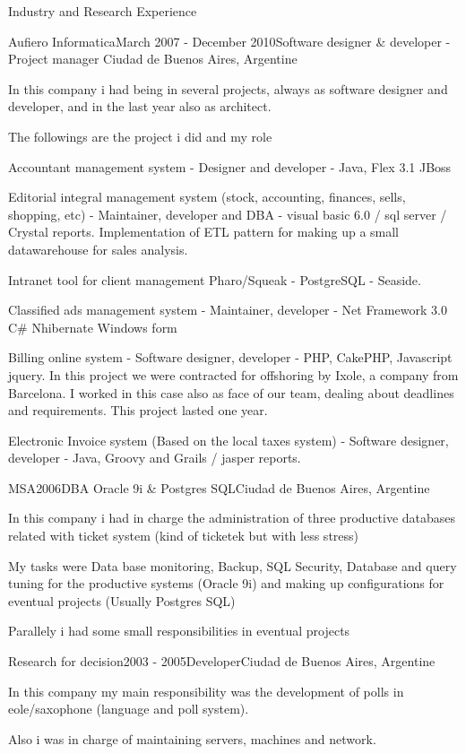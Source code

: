 \documentclass{resume} %
\begin{document}
\begin{rSection}{Industry and Research Experience}
\begin{rSubsection}{Aufiero Informatica}{March 2007 - December 2010}{Software designer \& developer - Project manager }{Ciudad de Buenos Aires, Argentine}
\item In this company i had being in several projects, always as software designer and developer, and in the last year also as architect. 
\item The followings are the project i did and my role
\item Accountant management system - Designer and developer - Java, Flex 3.1 JBoss 
\item Editorial integral management system (stock, accounting, finances, sells, shopping, etc) - Maintainer, developer and DBA - visual basic 6.0 / sql server / Crystal reports. Implementation of ETL pattern for making up a small datawarehouse for sales analysis.
\item Intranet tool for client management Pharo/Squeak - PostgreSQL - Seaside. 
\item Classified ads management system - Maintainer, developer  - Net Framework 3.0 C\# Nhibernate Windows form
\item Billing online system - Software designer, developer - PHP, CakePHP, Javascript jquery. In this project we were contracted for offshoring by Ixole, a company from Barcelona. I worked in this case also as face of our team, dealing about deadlines and requirements. This project lasted one year.
\item Electronic Invoice system (Based on the local taxes system)  -  Software designer, developer - Java, Groovy and Grails / jasper reports.
\end{rSubsection}


\begin{rSubsection}{MSA}{2006}{DBA Oracle 9i \& Postgres SQL}{Ciudad de Buenos Aires, Argentine}
\item In this company i had in charge the administration of three productive databases related with ticket system (kind of ticketek but with less stress) 
\item My tasks were Data base monitoring, Backup, SQL Security, Database and query tuning for the productive systems (Oracle 9i) and making up configurations for eventual projects (Usually Postgres SQL)
\item Parallely i had some small responsibilities in eventual projects 
\end{rSubsection}


\begin{rSubsection}{Research for decision}{2003 - 2005}{Developer}{Ciudad de Buenos Aires, Argentine}
\item In this company my main responsibility was the development of polls in eole/saxophone (language and poll system).
\item Also i was in charge of maintaining servers, machines and network.
\end{rSubsection}


\end{rSection}
\end{document}
